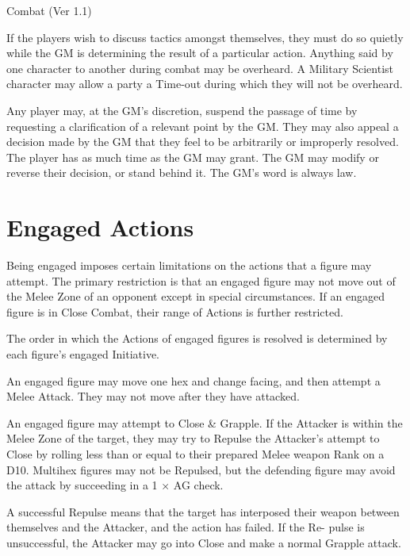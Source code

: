 \begin{Chapter}{Combat (Ver 1.1)}
\begin{Description}
\item[Discussions during Combat] If the players wish to discuss
  tactics amongst themselves, they must do so quietly while the GM is
  determining the result of a particular action. Anything said by one
  character to another during combat may be overheard.  A Military
  Scientist character may allow a party a Time-out during which they
  will not be overheard.

\item[Rule Clarification] Any player may, at the GM’s discretion,
  suspend the passage of time by requesting a clarification of a
  relevant point by the GM.  They may also appeal a decision made by
  the GM that they feel to be arbitrarily or improperly resolved.  The
  player has as much time as the GM may grant.  The GM may modify or
  reverse their decision, or stand behind it.  The GM’s word is always
  law.

\end{Description}

\section{Engaged Actions}

Being engaged imposes certain limitations on the actions that a figure
may attempt.  The primary restriction is that an engaged figure may
not move out of the Melee Zone of an opponent except in special
circumstances.  If an engaged figure is in Close Combat, their range
of Actions is further restricted.

The order in which the Actions of engaged figures is resolved is
determined by each figure’s engaged Initiative.

\begin{Description}

\item[Melee Attack] An engaged figure may move one hex and change
  facing, and then attempt a Melee Attack. They may not move after
  they have attacked.

\item[Close \& Grapple] An engaged figure may attempt to Close \&
  Grapple. If the Attacker is within the Melee Zone of the target,
  they may try to Repulse the Attacker’s attempt to Close by rolling
  less than or equal to their prepared Melee weapon Rank on a D10.
  Multihex figures may not be Repulsed, but the defending figure may
  avoid the attack by succeeding in a 1 × AG check.

  A successful Repulse means that the target has interposed their
  weapon between themselves and the Attacker, and the action has
  failed.  If the Re- pulse is unsuccessful, the Attacker may go into
  Close and make a normal Grapple attack.


\end{Description}
\end{Chapter}
